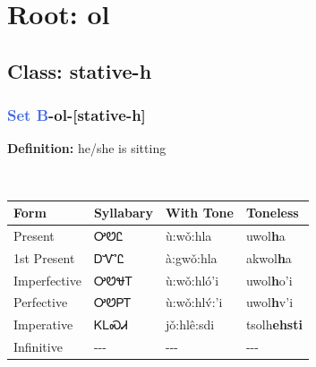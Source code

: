 \needspace{4in}
\section*{Root: ol}
\nopagebreak
{}
\needspace{3in}
\subsection*{Class: stative-h}
\nopagebreak
\needspace{2in}
\subsubsection*{\textcolor{RoyalBlue}{Set B}{-}\textbf{ol}{-}[stative-h]}
\nopagebreak
\textbf{Definition: } he/she is sitting
\\[0.5em]
\begin{tabularx}{\textwidth}{l X X X}%
\toprule%
\textbf{Form}&\textbf{Syllabary}&\textbf{With Tone}&\textbf{Toneless}\\%
\midrule%
Present&ᎤᏬᏝ&ù:wǒ:hla&uwol\textbf{h}a\\%
1st Present&ᎠᏉᏝ&à:gwǒ:hla&akwol\textbf{h}a\\%
Imperfective&ᎤᏬᏠᎢ&ù:wǒ:hló’i&uwol\textbf{h}o'i\\%
Perfective&ᎤᏬᏢᎢ&ù:wǒ:hlv́:’i&uwol\textbf{h}v'i\\%
Imperative&ᏦᏞᏍᏗ&jǒ:hlê:sdi&tsolh\textbf{ehsti}\\%
Infinitive&{-}{-}{-}&{-}{-}{-}&{-}{-}{-}\\%
\bottomrule%
\end{tabularx}
\\[1em]